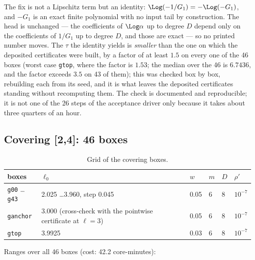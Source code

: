 The fix is not a Lipschitz term but an identity: $\Log(-1/G_{1})=-\Log(-G_{1})$,
and $-G_{1}$ is an exact finite polynomial with no input tail by construction.
The head is unchanged --- the coefficients of $\Log\alpha$ up to degree $D$
depend only on the coefficients of $1/G_{1}$ up to degree $D$, and those are
exact --- so no printed number moves. The $\tau$ the identity yields is
\emph{smaller} than the one on which the deposited certificates were built, by
a factor of at least $1.5$ on every one of the 46 boxes (worst case \texttt{gtop}, where the factor is $1.53$; the median over the 46 is $6.7436$, and the factor exceeds $3.5$ on 43 of them); this was checked box by box, rebuilding each from its seed, and
it is what leaves the deposited certificates standing without recomputing them.
The check is documented and reproducible; it is not one of the 26 steps of the
acceptance driver only because it takes about three quarters of an hour.



\subsection{Covering [2,4]: 46 boxes}\label{sec:3.6}

\begin{table}[h]
\centering
\caption{Grid of the covering boxes.}\label{tab:3.6-grid}
{\footnotesize\setlength{\tabcolsep}{3pt}
\begin{tabular}{llllll}
\toprule
boxes & $\ell_{0}$ & $w$ & $m$ & $D$ & $\rho'$ \\
\midrule
\texttt{g00} \ldots \texttt{g43} & 2.025 \ldots 3.960, step 0.045 & 0.05 & 6 & 8 & $10^{-7}$ \\
\texttt{ganchor} & 3.000 (cross-check with the pointwise certificate at $\ell=3$) & 0.05 & 6 & 8 & $10^{-7}$ \\
\texttt{gtop} & 3.9925 & 0.03 & 6 & 8 & $10^{-7}$ \\
\bottomrule
\end{tabular}}
\end{table}

Ranges over all 46 boxes (cost: 42.2 core-minutes):

